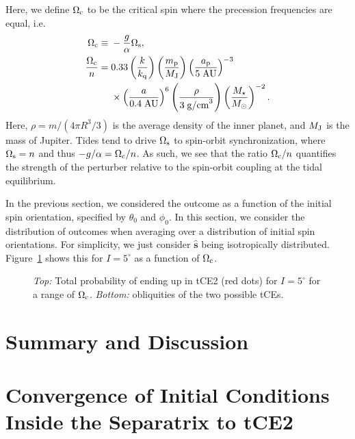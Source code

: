 \documentclass[
        fleqn,
        usenatbib,
    ]{mnras}
\newcommand*{\p}[1]{\left(#1\right)}
\newcommand*{\uv}[1]{\hat{\mathbf{#1}}}
\begin{document}
Here, we define $\Omega_{\rm c}$ to be the critical spin where the
precession frequencies are equal, i.e.
\begin{align}
    \Omega_{\rm c} \equiv{}& -\frac{g}{\alpha}\Omega_{\rm s},\\
    \frac{\Omega_{\rm c}}{n} ={}& 0.33 \p{\frac{k}{k_{\rm q}}}
            \p{\frac{m_{\rm p}}{M_{\rm J}}}
            \p{\frac{a_{\rm p}}{5 \;\mathrm{AU}}}^{-3}\nonumber\\
        &\times \p{\frac{a}{0.4\;\mathrm{AU}}}^{6}
            \p{\frac{\rho}{3 \; \mathrm{g/cm}^3}}
            \p{\frac{M_\star}{M_{\odot}}}^{-2}.\label{eq:def_Wc}
\end{align}
Here, $\rho = m / \p{4\pi R^3/3}$ is the average density of the inner planet,
and $M_{\rm J}$ is the mass of Jupiter. Tides tend to drive $\Omega_{\rm s}$ to
spin-orbit synchronization, where $\Omega_{\rm s} = n$ and thus $-g / \alpha =
\Omega_{\rm c} / n$. As such, we see that the ratio $\Omega_{\rm c} / n$
quantifies the strength of the perturber relative to the spin-orbit coupling at
the tidal equilibrium.

In the previous section, we considered the outcome as a function of the initial
spin orientation, specified by $\theta_0$ and $\phi_0$. In this section, we
consider the distribution of outcomes when averaging over a distribution of
initial spin orientations. For simplicity, we just consider $\uv{s}$ being
isotropically distributed. Figure~\ref{fig:probs} shows this for $I
= 5^\circ$ as a function of $\Omega_{\rm c}$.
\begin{figure}
    \centering
    \caption{\emph{Top:} Total probability of ending up in tCE2 (red dots) for
    $I = 5^\circ$ for a range of $\Omega_{\rm c}$. \emph{Bottom:}
    obliquities of the two possible tCEs.}\label{fig:probs}
\end{figure}

\section{Summary and Discussion}\label{s:summary}




\appendix

\onecolumn

\section{Convergence of Initial Conditions Inside the Separatrix to tCE2
}\label{sss:cs_stab2}
\end{document}
